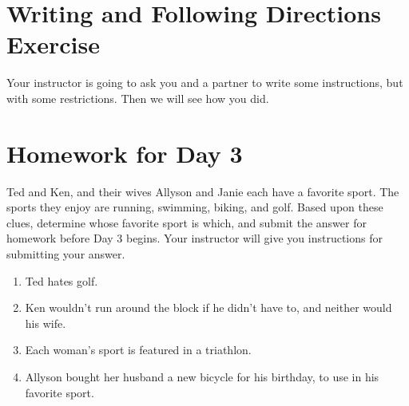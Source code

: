 \section{Writing and Following Directions Exercise}

Your instructor is going to ask you and a partner to write some instructions, but with some restrictions.  Then we will see how you did.

\section{Homework for Day 3}

Ted and Ken, and their wives Allyson and Janie each have a favorite sport.  The sports they enjoy are running, swimming, biking, and golf.  Based upon these clues, determine whose favorite sport is which, and submit the answer for homework before Day 3 begins.  Your instructor will give you instructions for submitting your answer.
\begin{enumerate}
\item Ted hates golf.
\item Ken wouldn't run around the block if he didn't have to, and neither would his wife.
\item Each woman's sport is featured in a triathlon.
\item Allyson bought her husband a new bicycle for his birthday, to use in his favorite sport.
\end{enumerate}

